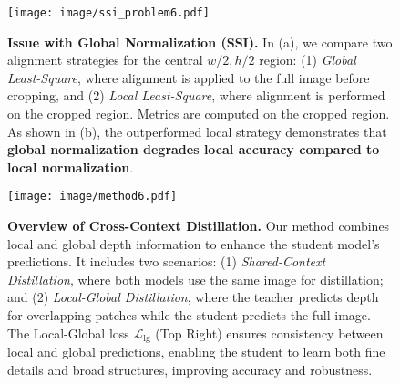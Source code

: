 \begin{figure}[t]
    \centering  \texttt{[image: image/ssi\_problem6.pdf]}
    \caption{
    \textbf{Issue with Global Normalization (SSI).} 
    In (a), we compare two alignment strategies for the central \( w/2, h/2 \) region: (1) \textit{Global Least-Square}, where alignment is applied to the full image before cropping, and (2) \textit{Local Least-Square}, where alignment is performed on the cropped region. Metrics are computed on the cropped region. As shown in (b), 
    the outperformed local strategy demonstrates
    that \textbf{global normalization degrades local accuracy compared to local normalization}.
    }
    \label{fig:normalization}
\end{figure}

\begin{figure*}[!t]
    \centering    \texttt{[image: image/method6.pdf]}
    \vspace{-1em}
    \caption{
    \textbf{Overview of Cross-Context Distillation.} 
    Our method combines local and global depth information to enhance the student model’s predictions. It includes two scenarios: (1) \textit{Shared-Context Distillation}, where both models use the same image for distillation;
    and (2) \textit{Local-Global Distillation}, where the teacher predicts depth for overlapping patches while the student predicts the full image. The Local-Global loss $\mathcal{L}_{\text{lg}}$ (Top Right) ensures consistency between local and global predictions, enabling the student to learn both fine details and broad structures, improving accuracy and robustness.
    }
    \vspace{-1em}
    \label{fig:method}
\end{figure*}
